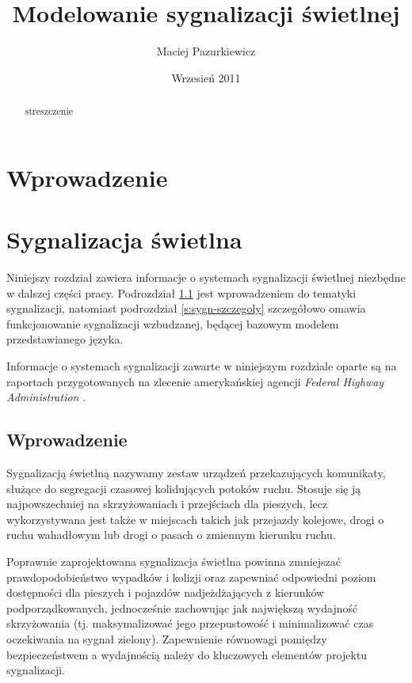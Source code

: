 \documentclass{pracamgr}
\author{Maciej Pazurkiewicz}
\title{Modelowanie sygnalizacji świetlnej}
\date{Wrzesień 2011}
\begin{document}
\maketitle

\begin{abstract}
streszczenie
\end{abstract}

\tableofcontents

\chapter*{Wprowadzenie}

\chapter{Sygnalizacja świetlna}
\label{c:sygnalizacja}

Niniejszy rozdział zawiera informacje o systemach sygnalizacji
świetlnej niezbędne w dalszej części pracy. Podrozdział
\ref{s:sygn-wprowadzenie} jest wprowadzeniem do tematyki sygnalizacji,
natomiast podrozdział \ref{s:sygn-szczegoly} szczegółowo omawia
funkcjonowanie sygnalizacji wzbudzanej, będącej bazowym modelem
przedstawianego języka.

Informacje o systemach sygnalizacji zawarte w niniejszym rozdziale
oparte są na raportach przygotowanych na zlecenie amerykańskiej
agencji \emph{Federal Highway Administration} \cite{timing}
\cite{handbook}.

\section{Wprowadzenie}
\label{s:sygn-wprowadzenie}

Sygnalizacją świetlną nazywamy zestaw urządzeń przekazujących
komunikaty, służące do segregacji czasowej kolidujących potoków
ruchu. Stosuje się ją najpowszechniej na skrzyżowaniach i przejściach
dla pieszych, lecz wykorzystywana jest także w miejscach takich jak
przejazdy kolejowe, drogi o ruchu wahadłowym lub drogi o pasach o
zmiennym kierunku ruchu.

Poprawnie zaprojektowana sygnalizacja świetlna powinna zmniejszać
prawdopodobieństwo wypadków i kolizji oraz zapewniać odpowiedni poziom
dostępności dla pieszych i pojazdów nadjeżdżających z kierunków
podporządkowanych, jednocześnie zachowując jak największą wydajność
skrzyżowania (tj. maksymalizować jego przepustowość i minimalizować
czas oczekiwania na sygnał zielony).  Zapewnienie równowagi pomiędzy
bezpieczeństwem a wydajnością należy do kluczowych elementów projektu
sygnalizacji.
\end{document}
